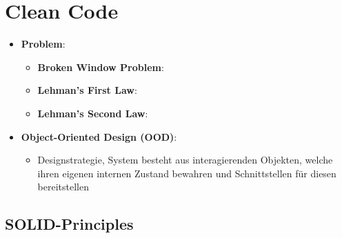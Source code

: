 \section{Clean Code}
\label{cc:sec:clean_code}

\begin{itemize}
\item \textbf{Problem}:
	\begin{itemize}
		\item \textbf{Broken Window Problem}: 
		\item \textbf{Lehman's First Law}: 
		\item \textbf{Lehman's Second Law}: 
	\end{itemize}
\item \textbf{Object-Oriented Design (OOD)}:
	\begin{itemize}
		\item Designstrategie, System besteht aus interagierenden Objekten, welche ihren eigenen internen Zustand bewahren und Schnittstellen für diesen bereitstellen
	\end{itemize}
\end{itemize}

\subsection{SOLID-Principles}
\label{cc:sub:solid_principles}


